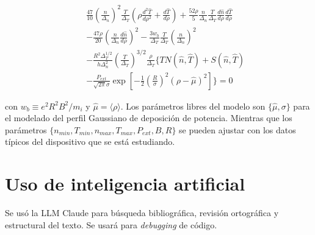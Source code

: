 \begin{eqnarray}\label{eq:energyODEnorm}
	&& \frac{47}{10}\left(\frac{n}{\Delta_n}\right)^2\frac{T}{\Delta_T}\left(\rho\frac{d^2\hat{T}}{d\rho^2} + \frac{d\hat{T}}{d\rho}\right) +  \frac{52\rho}{5}\frac{n}{\Delta_n}\frac{T}{\Delta_T}\frac{d\hat{n}}{d\rho}\frac{d\hat{T}}{d\rho} \nonumber\\
	&& -\frac{47\rho}{20}\left(\frac{n}{\Delta_n}\frac{d\hat{n}}{d\rho}\right)^2 - \frac{3w_b}{\Delta_T}\frac{T}{\Delta_T}\left(\frac{n}{\Delta_n}\right)^2 \nonumber\\ 
	&&- \frac{R^2\Delta_T^{1/2}}{h\Delta_n^2}\left(\frac{T}{\Delta_T}\right)^{3/2}\frac{\rho}{\Delta_T} \biggl\{TN(\hat{n},\hat{T})+S(\hat{n},\hat{T})\nonumber\\
	&&-\frac{P_{ext}}{\sqrt{2\pi}\sigma}\exp{\left[-\frac{1}{2}\left(\frac{R}{\sigma}\right)^2(\rho-\hat{\mu})^2\right]}\biggl\} = 0
\end{eqnarray}

con $w_b \equiv e^2R^2B^2 / m_i$ y $\hat{\mu} = \langle \rho \rangle$. Los parámetros libres del modelo son $\{\hat{\mu}, \sigma\}$ para el modelado del perfil Gaussiano de deposición de potencia. Mientras que los parámetros $\{n_{min}, T_{min}, n_{max}, T_{max}, P_{ext}, B, R\}$ se pueden ajustar con los datos típicos del dispositivo que se está estudiando.

\section{Uso de inteligencia artificial}

Se usó la LLM Claude para búsqueda bibliográfica, revisión ortográfica y estructural del texto. Se usará para \textit{debugging} de código.






